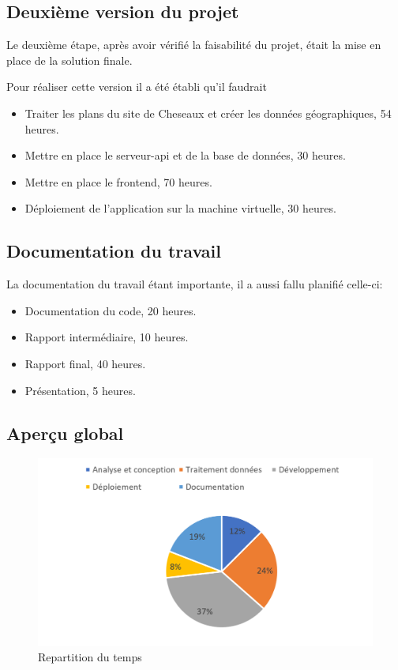 \documentclass[
    iai, %
    il, %
]{heig-tb}
\begin{document}
\subsection{Deuxième version du projet}
Le deuxième étape, après avoir vérifié la faisabilité du projet, était la mise en place de la solution finale.


Pour réaliser cette version il a été établi qu'il faudrait

\begin{itemize}
    \item Traiter les plans du site de Cheseaux et créer les données géographiques, 54 heures.
    \item Mettre en place le serveur-api et de la base de données, 30 heures.
    \item Mettre en place le frontend, 70 heures.
    \item Déploiement de l'application sur la machine virtuelle, 30 heures.
\end{itemize}

\subsection{Documentation du travail}
La documentation du travail étant importante, il a aussi fallu planifié celle-ci:

\begin{itemize}
    \item Documentation du code, 20 heures.
    \item Rapport intermédiaire, 10 heures.
    \item Rapport final, 40 heures.
    \item Présentation, 5 heures.
\end{itemize}

\subsection{Aperçu global}

\begin{figure}[h]
    \centering
    \includegraphics[scale=0.4]{RepartitionTemps.png}
    \caption{Repartition du temps}
    \label{fig:temps1}
\end{figure}
\end{document}
